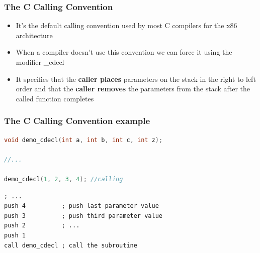 \documentclass[]{beamer}
\begin{document}


\begin{frame}
  \frametitle{The C Calling Convention}
  \begin{itemize}
  \item{It's the default calling convention used by most C compilers for the x86 architecture}
  \item{When a compiler doesn't use this convention we can force it using the modifier \color{red}\_cdecl}
  \item{It specifies that the \textbf{caller places} parameters on the stack in the right to left order and that the \textbf{caller removes} the parameters from the stack after the called function completes}
  \end{itemize}
\end{frame}
\begin{frame}[fragile]
  \frametitle{The C Calling Convention example}
\begin{lstlisting}[language=C]
void demo_cdecl(int a, int b, int c, int z);

//...

demo_cdecl(1, 2, 3, 4); //calling
\end{lstlisting}

\begin{lstlisting}[language={[x86masm]Assembler}]
; ...
push 4          ; push last parameter value
push 3          ; push third parameter value
push 2          ; ...
push 1
call demo_cdecl ; call the subroutine
\end{lstlisting}

\end{frame}
\end{document}
